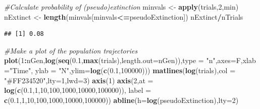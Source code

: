 \documentclass[
  a4paper]{book}
\newenvironment{Shaded}{\begin{snugshade}}{\end{snugshade}}
\newcommand{\AttributeTok}[1]{\textcolor[rgb]{0.13,0.29,0.53}{#1}}
\newcommand{\CommentTok}[1]{\textcolor[rgb]{0.56,0.35,0.01}{\textit{#1}}}
\newcommand{\DecValTok}[1]{\textcolor[rgb]{0.00,0.00,0.81}{#1}}
\newcommand{\FloatTok}[1]{\textcolor[rgb]{0.00,0.00,0.81}{#1}}
\newcommand{\FunctionTok}[1]{\textcolor[rgb]{0.13,0.29,0.53}{\textbf{#1}}}
\newcommand{\NormalTok}[1]{#1}
\newcommand{\OtherTok}[1]{\textcolor[rgb]{0.56,0.35,0.01}{#1}}
\newcommand{\SpecialCharTok}[1]{\textcolor[rgb]{0.81,0.36,0.00}{\textbf{#1}}}
\newcommand{\StringTok}[1]{\textcolor[rgb]{0.31,0.60,0.02}{#1}}
\begin{document}
\begin{Shaded}
\begin{Highlighting}[]
\CommentTok{\#Calculate probability of (pseudo)extinction}
\NormalTok{minvals }\OtherTok{\textless{}{-}} \FunctionTok{apply}\NormalTok{(trials,}\DecValTok{2}\NormalTok{,min)}
\NormalTok{nExtinct }\OtherTok{\textless{}{-}} \FunctionTok{length}\NormalTok{(minvals[minvals}\SpecialCharTok{\textless{}=}\NormalTok{pseudoExtinction])}
\NormalTok{nExtinct}\SpecialCharTok{/}\NormalTok{nTrials}
\end{Highlighting}
\end{Shaded}

\begin{verbatim}
## [1] 0.08
\end{verbatim}

\begin{Shaded}
\begin{Highlighting}[]
\CommentTok{\#Make a plot of the population trajectories}
\FunctionTok{plot}\NormalTok{(}\DecValTok{1}\SpecialCharTok{:}\NormalTok{nGen,}\FunctionTok{log}\NormalTok{(}\FunctionTok{seq}\NormalTok{(}\FloatTok{0.1}\NormalTok{,}\FunctionTok{max}\NormalTok{(trials),}\AttributeTok{length.out=}\NormalTok{nGen)),}\AttributeTok{type =} \StringTok{"n"}\NormalTok{,}\AttributeTok{axes=}\NormalTok{F,}\AttributeTok{xlab =}\StringTok{"Time"}\NormalTok{, }\AttributeTok{ylab =} \StringTok{"N"}\NormalTok{,}\AttributeTok{ylim=}\FunctionTok{log}\NormalTok{(}\FunctionTok{c}\NormalTok{(}\FloatTok{0.1}\NormalTok{,}\DecValTok{100000}\NormalTok{)))}
\FunctionTok{matlines}\NormalTok{(}\FunctionTok{log}\NormalTok{(trials),}\AttributeTok{col =} \StringTok{"\#FF234520"}\NormalTok{,}\AttributeTok{lty=}\DecValTok{1}\NormalTok{,}\AttributeTok{lwd=}\DecValTok{3}\NormalTok{)}
\FunctionTok{axis}\NormalTok{(}\DecValTok{1}\NormalTok{)}
\FunctionTok{axis}\NormalTok{(}\DecValTok{2}\NormalTok{,}\AttributeTok{at =} \FunctionTok{log}\NormalTok{(}\FunctionTok{c}\NormalTok{(}\FloatTok{0.1}\NormalTok{,}\DecValTok{1}\NormalTok{,}\DecValTok{10}\NormalTok{,}\DecValTok{100}\NormalTok{,}\DecValTok{1000}\NormalTok{,}\DecValTok{10000}\NormalTok{,}\DecValTok{100000}\NormalTok{)),}
     \AttributeTok{label =} \FunctionTok{c}\NormalTok{(}\FloatTok{0.1}\NormalTok{,}\DecValTok{1}\NormalTok{,}\DecValTok{10}\NormalTok{,}\DecValTok{100}\NormalTok{,}\DecValTok{1000}\NormalTok{,}\DecValTok{10000}\NormalTok{,}\DecValTok{100000}\NormalTok{))}
\FunctionTok{abline}\NormalTok{(}\AttributeTok{h=}\FunctionTok{log}\NormalTok{(pseudoExtinction),}\AttributeTok{lty=}\DecValTok{2}\NormalTok{)}
\end{Highlighting}
\end{Shaded}
\end{document}
